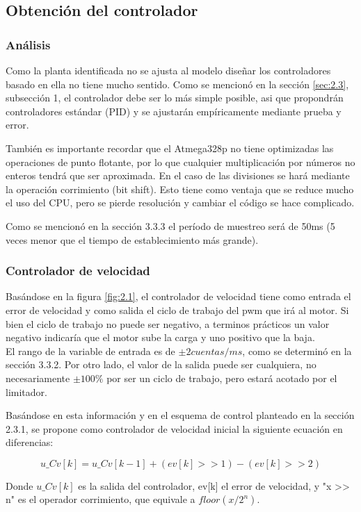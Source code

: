 \subsection{Obtención del controlador}
\subsubsection{Análisis}
Como la planta identificada no se ajusta al modelo diseñar los controladores basado en ella no tiene mucho sentido. Como se mencionó en la sección \ref{sec:2.3}, subsección 1, el controlador debe ser lo más simple posible, asi que propondrán controladores estándar (PID) y se ajustarán empíricamente mediante prueba y error.

También es importante recordar que el Atmega328p no tiene optimizadas las operaciones de punto flotante, por lo que cualquier multiplicación por números no enteros tendrá que ser aproximada. En el caso de las divisiones se hará mediante la operación corrimiento (bit shift). Esto tiene como ventaja que se reduce mucho el uso del CPU, pero se pierde resolución y cambiar el código se hace complicado.

Como se mencionó en la sección 3.3.3 el período de muestreo será de 50ms (5 veces menor que el tiempo de establecimiento más grande).

\subsubsection{Controlador de velocidad}
Basándose en la figura \ref{fig:2.1}, el controlador de velocidad tiene como entrada el error de velocidad y como salida el ciclo de trabajo del pwm que irá al motor. Si bien el ciclo de trabajo no puede ser negativo, a terminos prácticos un valor negativo indicaría que el motor sube la carga y uno positivo que la baja.\\
El rango de la variable de entrada es de \(\pm 2 cuentas/ms\), como se determinó en la sección 3.3.2. Por otro lado, el valor de la salida puede ser cualquiera, no necesariamente \(\pm 100\% \) por ser un ciclo de trabajo, pero estará acotado por el limitador.

Basándose en esta información y en el esquema de control planteado en la sección 2.3.1, se propone como controlador de velocidad inicial la siguiente ecuación en diferencias:

\[u\_Cv[k] = u\_Cv[k-1] + (ev[k] >> 1) - (ev[k] >> 2)\]

Donde \(u\_Cv[k]\) es la salida del controlador, ev[k] el error de velocidad, y "x >> n" es el operador corrimiento, que equivale a \(floor(x/2^n)\).

